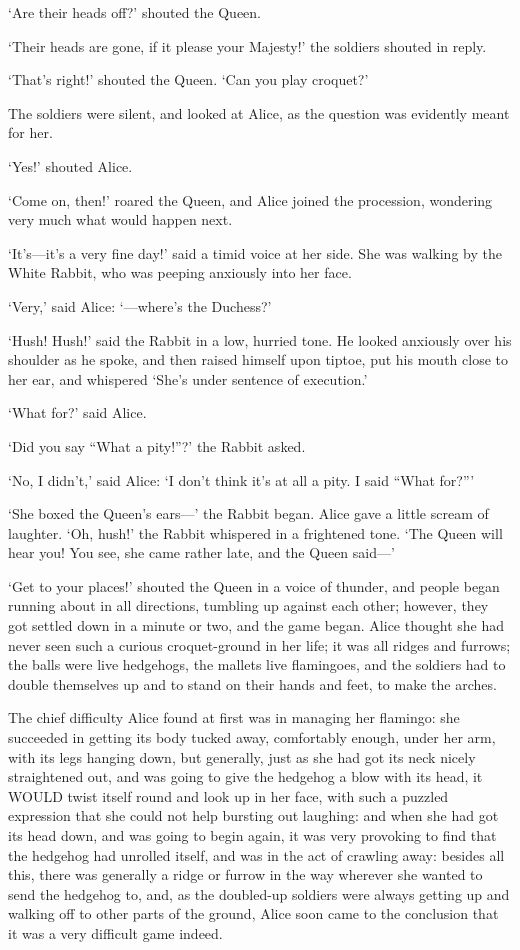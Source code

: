 \documentclass[12pt]{article}
\begin{document}
\begin{Parallel}[p]{}{}
{‘Are their heads off?’ shouted the Queen.

‘Their heads are gone, if it please your Majesty!’ the soldiers shouted in reply.

‘That’s right!’ shouted the Queen. ‘Can you play croquet?’

The soldiers were silent, and looked at Alice, as the question was evidently meant for her.

‘Yes!’ shouted Alice.

‘Come on, then!’ roared the Queen, and Alice joined the procession, wondering very much what would happen next.

‘It’s—it’s a very fine day!’ said a timid voice at her side. She was walking by the White Rabbit, who was peeping anxiously into her face.

‘Very,’ said Alice: ‘—where’s the Duchess?’

‘Hush! Hush!’ said the Rabbit in a low, hurried tone. He looked anxiously over his shoulder as he spoke, and then raised himself upon tiptoe, put his mouth close to her ear, and whispered ‘She’s under sentence of execution.’

‘What for?’ said Alice.

‘Did you say “What a pity!”?’ the Rabbit asked.

‘No, I didn’t,’ said Alice: ‘I don’t think it’s at all a pity. I said “What for?”’

‘She boxed the Queen’s ears—’ the Rabbit began. Alice gave a little scream of laughter. ‘Oh, hush!’ the Rabbit whispered in a frightened tone. ‘The Queen will hear you! You see, she came rather late, and the Queen said—’

‘Get to your places!’ shouted the Queen in a voice of thunder, and people began running about in all directions, tumbling up against each other; however, they got settled down in a minute or two, and the game began. Alice thought she had never seen such a curious croquet-ground in her life; it was all ridges and furrows; the balls were live hedgehogs, the mallets live flamingoes, and the soldiers had to double themselves up and to stand on their hands and feet, to make the arches.

The chief difficulty Alice found at first was in managing her flamingo: she succeeded in getting its body tucked away, comfortably enough, under her arm, with its legs hanging down, but generally, just as she had got its neck nicely straightened out, and was going to give the hedgehog a blow with its head, it WOULD twist itself round and look up in her face, with such a puzzled expression that she could not help bursting out laughing: and when she had got its head down, and was going to begin again, it was very provoking to find that the hedgehog had unrolled itself, and was in the act of crawling away: besides all this, there was generally a ridge or furrow in the way wherever she wanted to send the hedgehog to, and, as the doubled-up soldiers were always getting up and walking off to other parts of the ground, Alice soon came to the conclusion that it was a very difficult game indeed.

}
\end{Parallel}
\end{document}
